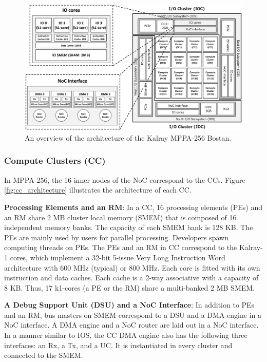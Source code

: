 \documentclass[conference,compsoc]{IEEEtran}
\begin{document}
\begin{figure}[t]
  \centering
  \includegraphics[width=1.0\linewidth]{../figure/mppa_architecture.eps}
  \caption{\label{fig:mppa_architecture}
    An overview of the architecture of the Kalray MPPA-256 Bostan.}
\end{figure}

\subsubsection{Compute Clusters (CC)}
\label{sec:cc}
In MPPA-256, the 16 inner nodes of the NoC correspond to the CCs.
Figure \ref{fig:cc_architecture} illustrates the architecture of each CC.

\textbf{Processing Elements and an RM}:
In a CC, 16 processing elements (PEs) and an RM share 2 MB cluster local memory (SMEM) that is composed of 16 independent memory banks.
The capacity of each SMEM bank is 128 KB.
The PEs are mainly used by users for parallel processing.
Developers spawn computing threads on PEs.
The PEs and an RM in CC correspond to the Kalray-1 cores, which implement a 32-bit 5-issue Very Long Instruction Word architecture with 600 MHz (typical) or 800 MHz.
Each core is fitted with its own instruction and data caches.
Each cache is a 2-way associative with a capacity of 8 KB.
Thus, 17 k1-cores (a PE or the RM) share a multi-banked 2 MB SMEM.

\textbf{A Debug Support Unit (DSU) and a NoC Interface}:
In addition to PEs and an RM, bus masters on SMEM correspond to a DSU and a DMA engine in a NoC interface.
A DMA engine and a NoC router are laid out in a NoC interface.
In a manner similar to IOS, the CC DMA engine also has the following three interfaces: an Rx, a Tx, and a UC. 
It is instantiated in every cluster and connected to the SMEM.
\end{document}
